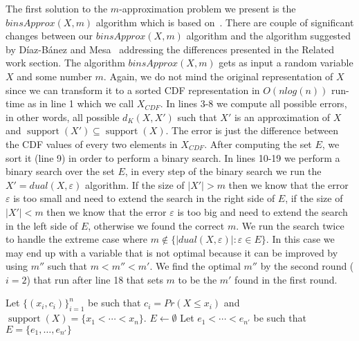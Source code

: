 \documentclass[letterpaper]{article} %
\DeclareMathOperator{\supp}{support}
\DeclareMathOperator{\support}{support}
\begin{document}
The first solution to the $m$-approximation problem we present is the $binsApprox(X,m)$ algorithm which is based on~\cite{diaz2001fitting}. There are couple of significant changes between our $binsApprox(X,m)$ algorithm and the algorithm suggested by D{\'i}az-B{\'a}nez and Mesa~ addressing the differences presented in the Related work section. The algorithm $binsApprox(X,m)$ gets as input a random variable $X$ and some number $m$. Again, we do not mind the original representation of $X$ since we can transform it to a sorted CDF representation in $O(nlog(n))$ run-time as in line 1 which we call $X_{CDF}$. In lines 3-8 we compute all possible errors, in other words, all possible $d_{K}(X,X')$ such that $X'$ is an approximation of $X$ and $\support(X') \subseteq \support(X)$. The error is just the difference between the CDF values of every two elements in $X_{CDF}$. After computing the set $E$, we sort it (line 9) in order to perform a binary search. In lines 10-19 we perform a binary search over the set $E$, in every step of the binary search we run the $X' = dual(X,\varepsilon)$ algorithm. If the size of $|X'|>m$ then we know that the error $\varepsilon$ is too small and need to extend the search in the right side of $E$, if the size of $|X'|<m$ then we know that the error $\varepsilon$ is too big and need to extend the search in the left side of $E$, otherwise we found the correct $m$. 
We run the search twice to handle the extreme case where $m \notin \{|dual(X,\varepsilon)| \colon \varepsilon\in E \}$. In this case we may end up with a variable that is not optimal because it can be improved by using $m''$ such that $m < m'' < m'$. We find the optimal $m''$  by the second round ($i=2$) that run after line 18 that sets $m$ to be the $m'$ found in the first round.
 

\begin{algorithm}
	\DontPrintSemicolon
	Let $\{(x_i, c_i)\}_{i=1}^n$ be such that $c_i=Pr(X \leq x_i)$ and $\supp(X)=\{x_1 < \cdots < x_n\}$.\;
    $E \gets \emptyset$\; 
    Let $e_1<\cdots<e_{n'}$ be such that $E=\{e_1,\dots,e_{n'}\}$ \;
    

	\caption{$binsApprox(X,m)$}   
	\label{alg:naive}
\end{algorithm}
\end{document}
